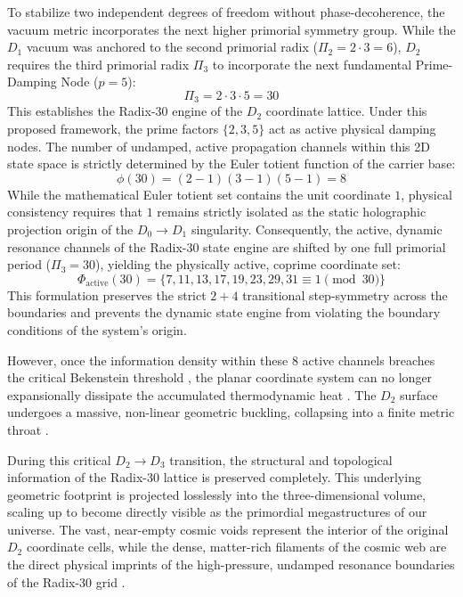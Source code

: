 \documentclass[11pt,a4paper]{article}
\theoremstyle{plain}
\theoremstyle{definition}
\theoremstyle{remark}
\begin{document}
To stabilize two independent degrees of freedom without phase-decoherence, the vacuum metric incorporates the next higher primorial symmetry group. While the $D_1$ vacuum was anchored to the second primorial radix ($\Pi_2 = 2 \cdot 3 = 6$), $D_2$ requires the third primorial radix $\Pi_3$ to incorporate the next fundamental Prime-Damping Node ($p=5$):
\begin{equation}
\Pi_3 = 2 \cdot 3 \cdot 5 = 30
\end{equation}
This establishes the Radix-30 engine of the $D_2$ coordinate lattice. Under this proposed framework, the prime factors $\{2, 3, 5\}$ act as active physical damping nodes. The number of undamped, active propagation channels within this 2D state space is strictly determined by the Euler totient function of the carrier base:
\begin{equation}
\phi(30) = (2 - 1)(3 - 1)(5 - 1) = 8
\end{equation}
While the mathematical Euler totient set contains the unit coordinate $1$, physical consistency requires that $1$ remains strictly isolated as the static holographic projection origin of the $D_0 \to D_1$ singularity. Consequently, the active, dynamic resonance channels of the Radix-30 state engine are shifted by one full primorial period ($\Pi_3 = 30$), yielding the physically active, coprime coordinate set:
\begin{equation}
\Phi_{\text{active}}(30) = \{7, 11, 13, 17, 19, 23, 29, 31 \equiv 1 \pmod{30}\}
\end{equation}
This formulation preserves the strict $2+4$ transitional step-symmetry across the boundaries and prevents the dynamic state engine from violating the boundary conditions of the system's origin.

However, once the information density within these 8 active channels breaches the critical Bekenstein threshold \cite{bekenstein1981}, the planar coordinate system can no longer expansionally dissipate the accumulated thermodynamic heat \cite{bekenstein1981, landauer1961}. The $D_2$ surface undergoes a massive, non-linear geometric buckling, collapsing into a finite metric throat \cite{hawking1975}. 

During this critical $D_2 \rightarrow D_3$ transition, the structural and topological information of the Radix-30 lattice is preserved completely. This underlying geometric footprint is projected losslessly into the three-dimensional volume, scaling up to become directly visible as the primordial megastructures of our universe. The vast, near-empty cosmic voids represent the interior of the original $D_2$ coordinate cells, while the dense, matter-rich filaments of the cosmic web are the direct physical imprints of the high-pressure, undamped resonance boundaries of the Radix-30 grid \cite{volovik2003}.
\newpage
\end{document}
